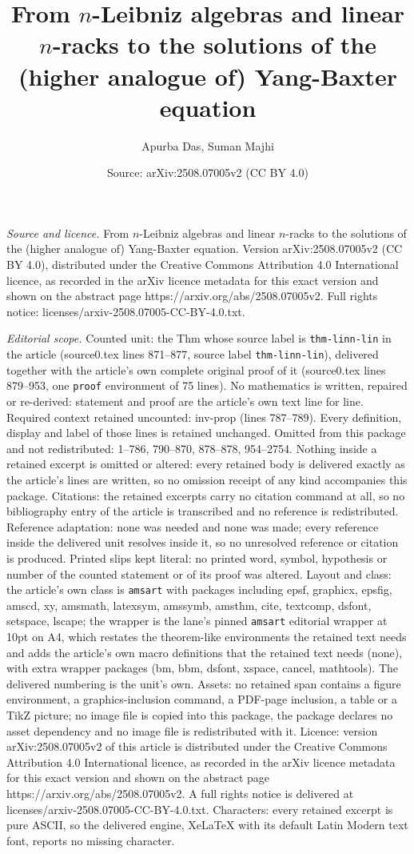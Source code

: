 \documentclass[10pt,a4paper]{amsart}
\title[From $n$-Leibniz algebras and linear $n$-racks to the soluti]{From $n$-Leibniz algebras and linear $n$-racks to the solutions of the (higher analogue of) Yang-Baxter equation}
\author{Apurba Das, Suman Majhi}
\date{Source: arXiv:2508.07005v2 (CC BY 4.0)}
\begin{document}
\maketitle

\noindent\emph{Source and licence.} From $n$-Leibniz algebras and linear $n$-racks to the solutions of the (higher analogue of) Yang-Baxter equation. Version arXiv:2508.07005v2 (CC BY 4.0), distributed under the Creative Commons Attribution 4.0 International licence, as recorded in the arXiv licence metadata for this exact version and shown on the abstract page https://arxiv.org/abs/2508.07005v2. Full rights notice: licenses/arxiv-2508.07005-CC-BY-4.0.txt.\par\smallskip

\noindent\textit{Editorial scope.} Counted unit: the Thm whose source label is \texttt{thm-linn-lin} in the article (source0.tex lines 871--877, source label \texttt{thm-linn-lin}), delivered together with the article's own complete original proof of it (source0.tex lines 879--953, one \texttt{proof} environment of 75 lines). No mathematics is written, repaired or re-derived: statement and proof are the article's own text line for line. Required context retained uncounted: inv-prop (lines 787--789). Every definition, display and label of those lines is retained unchanged. Omitted from this package and not redistributed: 1--786, 790--870, 878--878, 954--2754. Nothing inside a retained excerpt is omitted or altered: every retained body is delivered exactly as the article's lines are written, so no omission receipt of any kind accompanies this package. Citations: the retained excerpts carry no citation command at all, so no bibliography entry of the article is transcribed and no reference is redistributed. Reference adaptation: none was needed and none was made; every reference inside the delivered unit resolves inside it, so no unresolved reference or citation is produced. Printed slips kept literal: no printed word, symbol, hypothesis or number of the counted statement or of its proof was altered. Layout and class: the article's own class is \texttt{amsart} with packages including epsf, graphicx, epsfig, amscd, xy, amsmath, latexsym, amssymb, amsthm, cite, textcomp, dsfont, setspace, lscape; the wrapper is the lane's pinned \texttt{amsart} editorial wrapper at 10pt on A4, which restates the theorem-like environments the retained text needs and adds the article's own macro definitions that the retained text needs (none), with extra wrapper packages (bm, bbm, dsfont, xspace, cancel, mathtools). The delivered numbering is the unit's own. Assets: no retained span contains a figure environment, a graphics-inclusion command, a PDF-page inclusion, a table or a TikZ picture; no image file is copied into this package, the package declares no asset dependency and no image file is redistributed with it. Licence: version arXiv:2508.07005v2 of this article is distributed under the Creative Commons Attribution 4.0 International licence, as recorded in the arXiv licence metadata for this exact version and shown on the abstract page https://arxiv.org/abs/2508.07005v2. A full rights notice is delivered at licenses/arxiv-2508.07005-CC-BY-4.0.txt. Characters: every retained excerpt is pure ASCII, so the delivered engine, XeLaTeX with its default Latin Modern text font, reports no missing character.
\end{document}
